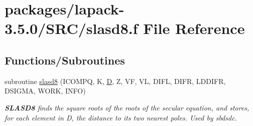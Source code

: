 \hypertarget{slasd8_8f}{}\section{packages/lapack-\/3.5.0/\+S\+R\+C/slasd8.f File Reference}
\label{slasd8_8f}
\subsection*{Functions/\+Subroutines}
\begin{DoxyCompactItemize}
\item 
subroutine \hyperlink{group__auxOTHERauxiliary_gac4e0b8da65a5d9493e17f46cd010e6cc}{slasd8} (I\+C\+O\+M\+P\+Q, K, \hyperlink{odrpack_8h_a7dae6ea403d00f3687f24a874e67d139}{D}, Z, V\+F, V\+L, D\+I\+F\+L, D\+I\+F\+R, L\+D\+D\+I\+F\+R, D\+S\+I\+G\+M\+A, W\+O\+R\+K, I\+N\+F\+O)
\begin{DoxyCompactList}\small\item\em {\bfseries S\+L\+A\+S\+D8} finds the square roots of the roots of the secular equation, and stores, for each element in D, the distance to its two nearest poles. Used by sbdsdc. \end{DoxyCompactList}\end{DoxyCompactItemize}
